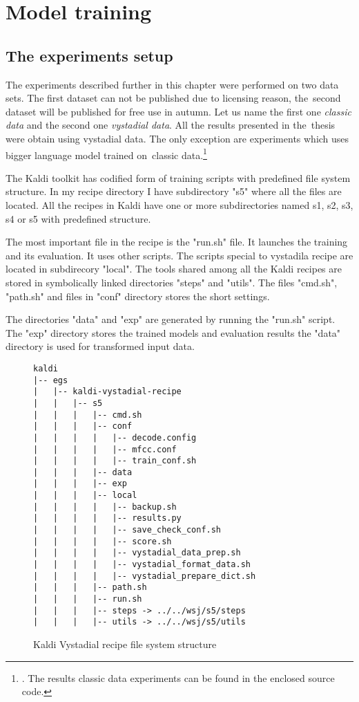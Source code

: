 \chapter{Model training}
\label{cha:training}


\section{The experiments setup} 
\label{sec:the_experiments_setup}

The experiments described further in this chapter were performed on two data sets.
The first dataset can not be published due to licensing reason, 
the~second dataset will be published for free use in autumn.
Let us name the first one {\it classic data} and the second one {\it vystadial data}.
All the results presented in the~thesis were obtain using vystadial data.
The only exception are experiments which uses bigger language model trained 
on~classic data.\footnote{. The results classic data experiments 
can be found in the enclosed source code.}

\small{The Kaldi toolkit has codified form of training scripts with predefined file system structure. 
In my recipe directory I have subdirectory "s5" where all the files are located. All the recipes in Kaldi have 
 one or more subdirectories named s1, s2, s3, s4 or s5 with predefined structure.

The most important file in the recipe is the "run.sh" file. It launches the training and its evaluation.
It uses other scripts. The scripts special to vystadila recipe are located in subdirecory "local".
The tools shared among all the Kaldi recipes are stored in symbolically linked directories "steps" and "utils".
The files "cmd.sh", "path.sh" and files in "conf" directory stores the short settings.

The directories "data" and "exp" are generated by running the "run.sh" script.
The "exp" directory stores the trained models and evaluation results the "data" 
directory is used for transformed input data.}

 \begin{figure}[!hbp]
\begin{verbatim}
kaldi
|-- egs
|   |-- kaldi-vystadial-recipe
|   |   |-- s5
|   |   |   |-- cmd.sh
|   |   |   |-- conf
|   |   |   |   |-- decode.config
|   |   |   |   |-- mfcc.conf
|   |   |   |   |-- train_conf.sh
|   |   |   |-- data
|   |   |   |-- exp
|   |   |   |-- local
|   |   |   |   |-- backup.sh
|   |   |   |   |-- results.py
|   |   |   |   |-- save_check_conf.sh
|   |   |   |   |-- score.sh
|   |   |   |   |-- vystadial_data_prep.sh
|   |   |   |   |-- vystadial_format_data.sh
|   |   |   |   |-- vystadial_prepare_dict.sh
|   |   |   |-- path.sh
|   |   |   |-- run.sh
|   |   |   |-- steps -> ../../wsj/s5/steps
|   |   |   |-- utils -> ../../wsj/s5/utils
\end{verbatim}
\caption{Kaldi Vystadial recipe file system structure}
\label{fig:ascii-box}
\end{figure}

